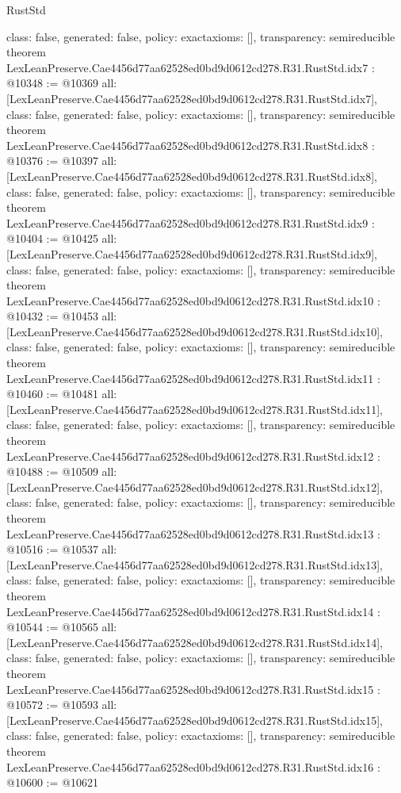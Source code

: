 \begin{lexlean}{RustStd}
\begin{coremodule}
{  class: false,
  generated: false,
  policy: exact{axioms: []},
  transparency: semireducible
}
theorem LexLeanPreserve.Cae4456d77aa62528ed0bd9d0612cd278.R31.RustStd.idx7 : @10348 := @10369 {
  all: [LexLeanPreserve.Cae4456d77aa62528ed0bd9d0612cd278.R31.RustStd.idx7],
  class: false,
  generated: false,
  policy: exact{axioms: []},
  transparency: semireducible
}
theorem LexLeanPreserve.Cae4456d77aa62528ed0bd9d0612cd278.R31.RustStd.idx8 : @10376 := @10397 {
  all: [LexLeanPreserve.Cae4456d77aa62528ed0bd9d0612cd278.R31.RustStd.idx8],
  class: false,
  generated: false,
  policy: exact{axioms: []},
  transparency: semireducible
}
theorem LexLeanPreserve.Cae4456d77aa62528ed0bd9d0612cd278.R31.RustStd.idx9 : @10404 := @10425 {
  all: [LexLeanPreserve.Cae4456d77aa62528ed0bd9d0612cd278.R31.RustStd.idx9],
  class: false,
  generated: false,
  policy: exact{axioms: []},
  transparency: semireducible
}
theorem LexLeanPreserve.Cae4456d77aa62528ed0bd9d0612cd278.R31.RustStd.idx10 : @10432 := @10453 {
  all: [LexLeanPreserve.Cae4456d77aa62528ed0bd9d0612cd278.R31.RustStd.idx10],
  class: false,
  generated: false,
  policy: exact{axioms: []},
  transparency: semireducible
}
theorem LexLeanPreserve.Cae4456d77aa62528ed0bd9d0612cd278.R31.RustStd.idx11 : @10460 := @10481 {
  all: [LexLeanPreserve.Cae4456d77aa62528ed0bd9d0612cd278.R31.RustStd.idx11],
  class: false,
  generated: false,
  policy: exact{axioms: []},
  transparency: semireducible
}
theorem LexLeanPreserve.Cae4456d77aa62528ed0bd9d0612cd278.R31.RustStd.idx12 : @10488 := @10509 {
  all: [LexLeanPreserve.Cae4456d77aa62528ed0bd9d0612cd278.R31.RustStd.idx12],
  class: false,
  generated: false,
  policy: exact{axioms: []},
  transparency: semireducible
}
theorem LexLeanPreserve.Cae4456d77aa62528ed0bd9d0612cd278.R31.RustStd.idx13 : @10516 := @10537 {
  all: [LexLeanPreserve.Cae4456d77aa62528ed0bd9d0612cd278.R31.RustStd.idx13],
  class: false,
  generated: false,
  policy: exact{axioms: []},
  transparency: semireducible
}
theorem LexLeanPreserve.Cae4456d77aa62528ed0bd9d0612cd278.R31.RustStd.idx14 : @10544 := @10565 {
  all: [LexLeanPreserve.Cae4456d77aa62528ed0bd9d0612cd278.R31.RustStd.idx14],
  class: false,
  generated: false,
  policy: exact{axioms: []},
  transparency: semireducible
}
theorem LexLeanPreserve.Cae4456d77aa62528ed0bd9d0612cd278.R31.RustStd.idx15 : @10572 := @10593 {
  all: [LexLeanPreserve.Cae4456d77aa62528ed0bd9d0612cd278.R31.RustStd.idx15],
  class: false,
  generated: false,
  policy: exact{axioms: []},
  transparency: semireducible
}
theorem LexLeanPreserve.Cae4456d77aa62528ed0bd9d0612cd278.R31.RustStd.idx16 : @10600 := @10621 {
}
\end{coremodule}
\end{lexlean}
